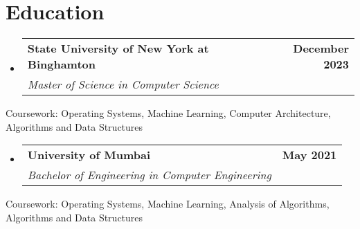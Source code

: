 \documentclass[letterpaper,8pt]{article}
\makeatletter
\newcommand{\resumeSubheading}[4]{
  \vspace{-2pt}\item
    \begin{tabular*}{1.0\textwidth}[t]{l@{\extracolsep{\fill}}r}
      \textbf{#1} & \textbf{\small #2} \\
      \textit{\small#3} & \textit{\small #4} \\
    \end{tabular*}\vspace{-7pt}
}
\newcommand{\resumeSubHeadingListStart}{\begin{itemize}[leftmargin=0.0in, label={}]}
\newcommand{\resumeSubHeadingListEnd}{\end{itemize}}\vspace{0pt}
\makeatother
\begin{document}
\section{Education}
  \resumeSubHeadingListStart
    \resumeSubheading
      {State University of New York at Binghamton}{December 2023}
      {Master of Science in Computer Science}{}
      
  \resumeSubHeadingListEnd
  \vspace{-4pt}
    Coursework: Operating Systems, Machine Learning, Computer Architecture, Algorithms and Data Structures \vspace{-4pt}
    \vspace{-4pt}
  \resumeSubHeadingListStart
    \resumeSubheading
      {University of Mumbai}{May 2021}
      {Bachelor of Engineering in Computer Engineering}{}
      
  \resumeSubHeadingListEnd
  \vspace{-4pt}
    Coursework: Operating Systems, Machine Learning, Analysis of Algorithms, Algorithms and Data Structures \vspace{-4pt}
    \vspace{-4pt}

\end{document}
